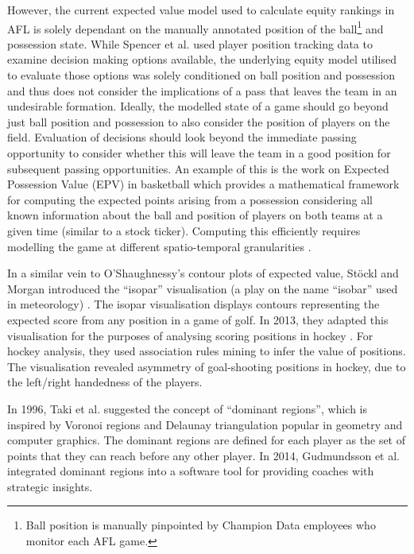 However, the current expected value model used to calculate equity rankings in AFL is solely dependant on the manually annotated position of the ball\footnote{Ball position is manually pinpointed by Champion Data employees who monitor each AFL game.} and possession state. While Spencer et al. \cite{Spencer2018} used player position tracking data to examine decision making options available, the underlying equity model utilised to evaluate those options was solely conditioned on ball position and possession and thus does not consider the implications of a pass that leaves the team in an undesirable formation. Ideally, the modelled state of a game should go beyond just ball position and possession to also consider the position of players on the field. Evaluation of decisions should look beyond the immediate passing opportunity to consider whether this will leave the team in a good position for subsequent passing opportunities. An example of this is the work on Expected Possession Value (EPV) in basketball \cite{Cervone2014} which provides a mathematical framework for computing the expected points arising from a possession considering all known information about the ball and position of players on both teams at a given time (similar to a stock ticker). Computing this efficiently requires modelling the game at different spatio-temporal granularities \cite{Cervone2016}.

In a similar vein to O'Shaughnessy's contour plots of expected value, St\"ockl and Morgan introduced the ``isopar'' visualisation (a play on the name ``isobar'' used in meteorology)
\cite{Stockl2011}. The isopar visualisation displays contours
representing the expected score from any position in a game of golf. In
2013, they adapted this visualisation for the purposes of analysing
scoring positions in hockey \cite{stockl_visualization_2013}. For
hockey analysis, they used association rules mining to infer the value
of positions. The visualisation revealed asymmetry of goal-shooting
positions in hockey, due to the left/right handedness of the players.

In 1996, Taki et al. \cite{Taki1996} suggested the concept of ``dominant
regions'', which is inspired by Voronoi regions and Delaunay
triangulation popular in geometry and computer graphics. The dominant
regions are defined for each player as the set of points that they can
reach before any other player. In 2014, Gudmundsson et al. \cite{Gudmundsson2014} integrated
dominant regions into a software tool for providing coaches with
strategic insights.

